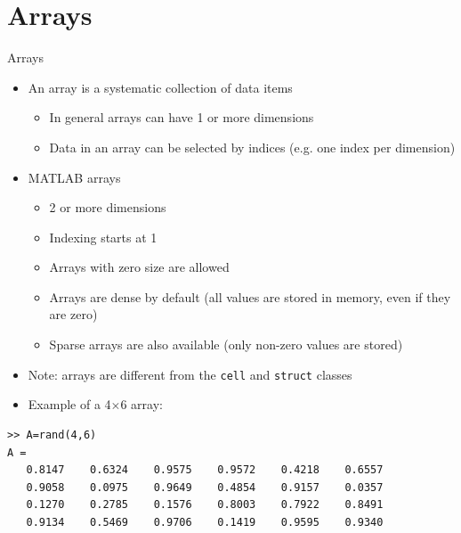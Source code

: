 \documentclass{beamer}
\begin{document}
\section{Arrays}
\begin{frame}[fragile]{Arrays}
	\begin{itemize}
		\item An array is a systematic collection of data items
		\begin{itemize}
			\item In general arrays can have 1 or more dimensions
			\item Data in an array can be selected by indices (e.g. one index per dimension)
		\end{itemize}
		\item MATLAB arrays
		\begin{itemize}
			\item 2 or more dimensions
			\item Indexing starts at 1
			\item Arrays with zero size are allowed
			\item Arrays are dense by default (all values are stored in memory, even if they are zero)
			\item Sparse arrays are also available (only non-zero values are stored)
		\end{itemize}
		\item Note: arrays are different from the \texttt{cell} and \texttt{struct} classes
		\item Example of a 4$\times$6 array:
	\end{itemize}
\begin{lstlisting}[style=Matlab-editor,basicstyle=\scriptsize]
>> A=rand(4,6)
A =
   0.8147    0.6324    0.9575    0.9572    0.4218    0.6557
   0.9058    0.0975    0.9649    0.4854    0.9157    0.0357
   0.1270    0.2785    0.1576    0.8003    0.7922    0.8491
   0.9134    0.5469    0.9706    0.1419    0.9595    0.9340
\end{lstlisting}
	
\end{frame}

\end{document}

